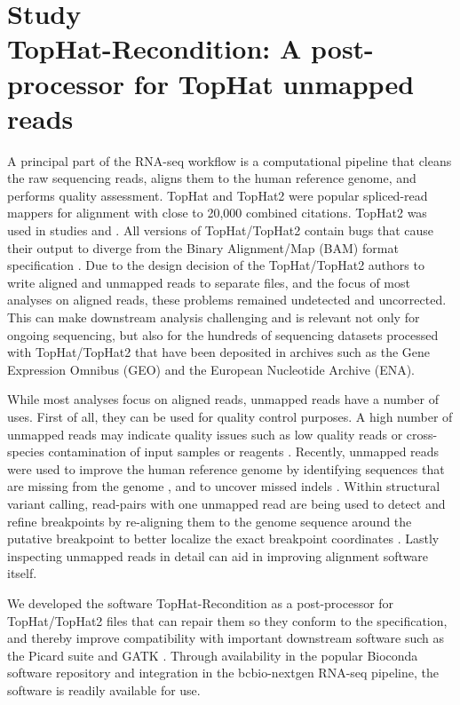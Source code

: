 \documentclass[11pt]{book}
\begin{document}
\section*{Study \II \\ TopHat-Recondition: A post-processor for TopHat unmapped reads}

A principal part of the RNA-seq workflow is a computational pipeline that cleans the raw sequencing reads, aligns them to the human reference genome, and performs quality assessment. TopHat and TopHat2 were popular spliced-read mappers \cite{Kim:2013-tophat2} for alignment with close to 20,000 combined citations. TopHat2 was used in studies \I and \III. All versions of TopHat/TopHat2 contain bugs that cause their output to diverge from the Binary Alignment/Map (BAM) format specification \cite{Li:2009-samtools, sam-format}. Due to the design decision of the TopHat/TopHat2 authors to write aligned and unmapped reads to separate files, and the focus of most analyses on aligned reads, these problems remained undetected and uncorrected. This can make downstream analysis challenging and is relevant not only for ongoing sequencing, but also for the hundreds of sequencing datasets processed with TopHat/TopHat2 that have been deposited in archives such as the Gene Expression Omnibus (GEO) and the European Nucleotide Archive (ENA).

While most analyses focus on aligned reads, unmapped reads have a number of uses. First of all, they can be used for quality control purposes. A high number of unmapped reads may indicate quality issues such as low quality reads or cross-species contamination of input samples or reagents \cite{Strong:2014, Glassing:2016, Sangiovanni:2019}. Recently, unmapped reads were used to improve the human reference genome by identifying sequences that are missing from the genome \cite{Eisfeldt:2019, Sherman:2019}, and to uncover missed indels \cite{Hasan:2019}. Within structural variant calling, read-pairs with one unmapped read are being used to detect and refine breakpoints by re-aligning them to the genome sequence around the putative breakpoint to better localize the exact breakpoint coordinates \cite{Olsson:2015, Cameron:2019}. Lastly inspecting unmapped reads in detail can aid in improving alignment software itself.

We developed the software TopHat-Recondition as a post-processor for TopHat/TopHat2 files that can repair them so they conform to the specification, and thereby improve compatibility with important downstream software such as the Picard suite and GATK \cite{McKenna:2010-gatk}. Through availability in the popular Bioconda software repository \cite{Bioconda:2018} and integration in the bcbio-nextgen \cite{bcbio-nextgen} RNA-seq pipeline, the software is readily available for use.
\end{document}
